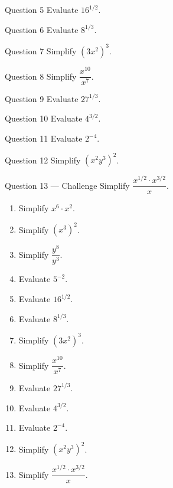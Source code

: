 \documentclass[11pt]{article}
\begin{document}
\begin{qbox}{Question 5}
Evaluate $16^{1/2}$.\workspace{2.4cm}
\end{qbox}

\begin{qbox}{Question 6}
Evaluate $8^{1/3}$.\workspace{2.4cm}
\end{qbox}

\begin{qbox}{Question 7}
Simplify $(3x^2)^3$.\workspace{2.4cm}
\end{qbox}

\begin{qbox}{Question 8}
Simplify $\dfrac{x^{10}}{x^{7}}$.\workspace{2.4cm}
\end{qbox}

\begin{qbox}{Question 9}
Evaluate $27^{1/3}$.\workspace{2.4cm}
\end{qbox}

\begin{qbox}{Question 10}
Evaluate $4^{3/2}$.\workspace{2.4cm}
\end{qbox}

\begin{qbox}{Question 11}
Evaluate $2^{-4}$.\workspace{2.4cm}
\end{qbox}

\begin{qbox}{Question 12}
Simplify $(x^2 y^3)^2$.\workspace{2.4cm}
\end{qbox}

\begin{qbox}{Question 13 --- Challenge}
Simplify $\dfrac{x^{1/2}\cdot x^{3/2}}{x}$.\workspace{2.6cm}
\end{qbox}

\clearpage
{}

\begin{recapbox}
\begin{multicols}{2}
\small
\begin{enumerate}[leftmargin=*,itemsep=3pt]
  \item Simplify $x^6\cdot x^2$.
  \item Simplify $(x^3)^2$.
  \item Simplify $\dfrac{y^8}{y^3}$.
  \item Evaluate $5^{-2}$.
  \item Evaluate $16^{1/2}$.
  \item Evaluate $8^{1/3}$.
  \item Simplify $(3x^2)^3$.
  \item Simplify $\dfrac{x^{10}}{x^{7}}$.
  \item Evaluate $27^{1/3}$.
  \item Evaluate $4^{3/2}$.
  \item Evaluate $2^{-4}$.
  \item Simplify $(x^2 y^3)^2$.
  \item Simplify $\dfrac{x^{1/2}\cdot x^{3/2}}{x}$.
\end{enumerate}
\end{multicols}
\end{recapbox}
\end{document}
